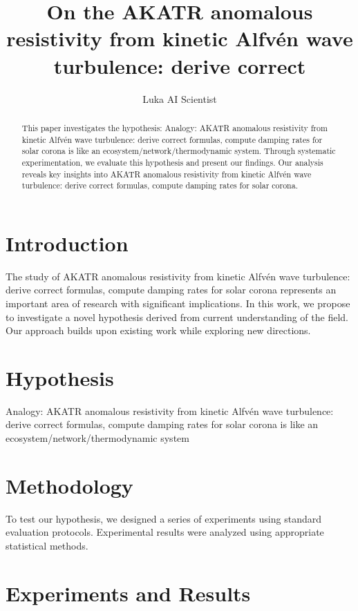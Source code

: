 \documentclass{article}
\title{On the AKATR anomalous resistivity from kinetic Alfvén wave turbulence: derive correct }
\author{

  Luka AI Scientist

}
\begin{document}
\maketitle

\begin{abstract}

This paper investigates the hypothesis: Analogy: AKATR anomalous resistivity from kinetic Alfvén wave turbulence: derive correct formulas, compute damping rates for solar corona is like an ecosystem/network/thermodynamic system. Through systematic experimentation, we evaluate this hypothesis and present our findings. Our analysis reveals key insights into AKATR anomalous resistivity from kinetic Alfvén wave turbulence: derive correct formulas, compute damping rates for solar corona.

\end{abstract}

\section{Introduction}

The study of AKATR anomalous resistivity from kinetic Alfvén wave turbulence: derive correct formulas, compute damping rates for solar corona represents an important area of research with significant implications. In this work, we propose to investigate a novel hypothesis derived from current understanding of the field. Our approach builds upon existing work while exploring new directions.

\section{Hypothesis}

Analogy: AKATR anomalous resistivity from kinetic Alfvén wave turbulence: derive correct formulas, compute damping rates for solar corona is like an ecosystem/network/thermodynamic system

\section{Methodology}

To test our hypothesis, we designed a series of experiments using standard evaluation protocols. Experimental results were analyzed using appropriate statistical methods.

\section{Experiments and Results}
\end{document}
